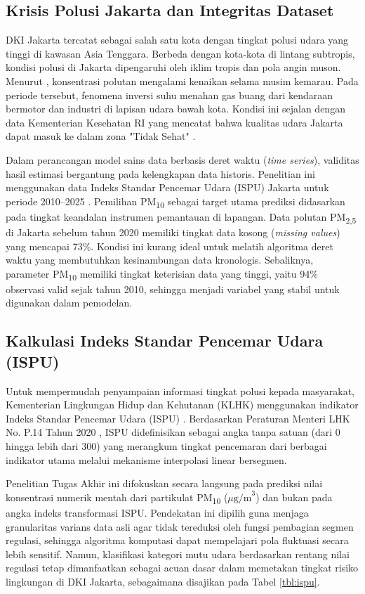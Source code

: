 \subsection{Krisis Polusi Jakarta dan Integritas Dataset}
DKI Jakarta tercatat sebagai salah satu kota dengan tingkat polusi udara yang tinggi di kawasan Asia Tenggara. Berbeda dengan kota-kota di lintang subtropis, kondisi polusi di Jakarta dipengaruhi oleh iklim tropis dan pola angin muson. Menurut \textcite{firdaus2023jakarta}, konsentrasi polutan mengalami kenaikan selama musim kemarau. Pada periode tersebut, fenomena inversi suhu menahan gas buang dari kendaraan bermotor dan industri di lapisan udara bawah kota. Kondisi ini sejalan dengan data Kementerian Kesehatan RI yang mencatat bahwa kualitas udara Jakarta dapat masuk ke dalam zona "Tidak Sehat" \autocite{kemkes2019air, aulia2024air}.

Dalam perancangan model sains data berbasis deret waktu (\textit{time series}), validitas hasil estimasi bergantung pada kelengkapan data historis. Penelitian ini menggunakan data Indeks Standar Pencemar Udara (ISPU) Jakarta untuk periode 2010--2025 \autocite{pohan2025jakarta}. Pemilihan PM\textsubscript{10} sebagai target utama prediksi didasarkan pada tingkat keandalan instrumen pemantauan di lapangan. Data polutan PM\textsubscript{2,5} di Jakarta sebelum tahun 2020 memiliki tingkat data kosong (\textit{missing values}) yang mencapai 73\%. Kondisi ini kurang ideal untuk melatih algoritma deret waktu yang membutuhkan kesinambungan data kronologis. Sebaliknya, parameter PM\textsubscript{10} memiliki tingkat keterisian data yang tinggi, yaitu 94\% observasi valid sejak tahun 2010, sehingga menjadi variabel yang stabil untuk digunakan dalam pemodelan.

\subsection{Kalkulasi Indeks Standar Pencemar Udara (ISPU)}

Untuk mempermudah penyampaian informasi tingkat polusi kepada masyarakat, Kementerian Lingkungan Hidup dan Kehutanan (KLHK) menggunakan indikator Indeks Standar Pencemar Udara (ISPU) \autocite{chaniago2020ispu}. Berdasarkan Peraturan Menteri LHK No. P.14 Tahun 2020 \autocite{permenlhk2020ispu}, ISPU didefinisikan sebagai angka tanpa satuan (dari 0 hingga lebih dari 300) yang merangkum tingkat pencemaran dari berbagai indikator utama melalui mekanisme interpolasi linear bersegmen.

Penelitian Tugas Akhir ini difokuskan secara langsung pada prediksi nilai konsentrasi numerik mentah dari partikulat PM\textsubscript{10} ($\mu\text{g/m}^3$) dan bukan pada angka indeks transformasi ISPU. Pendekatan ini dipilih guna menjaga granularitas varians data asli agar tidak tereduksi oleh fungsi pembagian segmen regulasi, sehingga algoritma komputasi dapat mempelajari pola fluktuasi secara lebih sensitif. Namun, klasifikasi kategori mutu udara berdasarkan rentang nilai regulasi tetap dimanfaatkan sebagai acuan dasar dalam memetakan tingkat risiko lingkungan di DKI Jakarta, sebagaimana disajikan pada Tabel \ref{tbl:ispu}.

